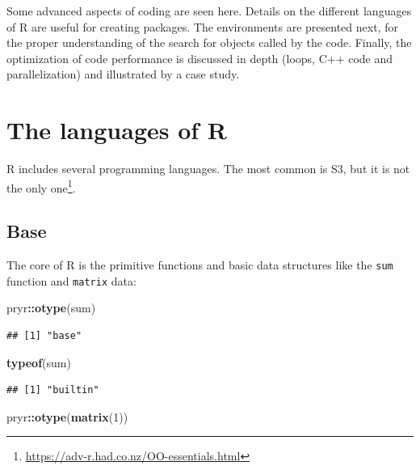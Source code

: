 \documentclass[
  12pt,
  american,
  a4paper,
  extrafontsizes,onecolumn,openright
  ]{memoir}
\newenvironment{Shaded}{\begin{snugshade}}{\end{snugshade}}
\newcommand{\DecValTok}[1]{\textcolor[rgb]{0.00,0.00,0.81}{#1}}
\newcommand{\FunctionTok}[1]{\textcolor[rgb]{0.13,0.29,0.53}{\textbf{#1}}}
\newcommand{\NormalTok}[1]{#1}
\newcommand{\SpecialCharTok}[1]{\textcolor[rgb]{0.81,0.36,0.00}{\textbf{#1}}}
\newlength{\rf}
\begin{document}
Some advanced aspects of coding are seen here.
Details on the different languages of R are useful for creating packages.
The environments are presented next, for the proper understanding of the search for objects called by the code.
Finally, the optimization of code performance is discussed in depth (loops, C++ code and parallelization) and illustrated by a case study.

\section{The languages of R}\label{the-languages-of-r}

R includes several programming languages.
The most common is S3, but it is not the only one\footnote{\url{https://adv-r.had.co.nz/OO-essentials.html}}.

\subsection{Base}\label{base}

The core of R is the primitive functions and basic data structures like the \texttt{sum} function and \texttt{matrix} data:

\scriptsize

\begin{Shaded}
\begin{Highlighting}[]
\NormalTok{pryr}\SpecialCharTok{::}\FunctionTok{otype}\NormalTok{(sum)}
\end{Highlighting}
\end{Shaded}

\begin{verbatim}
## [1] "base"
\end{verbatim}

\begin{Shaded}
\begin{Highlighting}[]
\FunctionTok{typeof}\NormalTok{(sum)}
\end{Highlighting}
\end{Shaded}

\begin{verbatim}
## [1] "builtin"
\end{verbatim}

\begin{Shaded}
\begin{Highlighting}[]
\NormalTok{pryr}\SpecialCharTok{::}\FunctionTok{otype}\NormalTok{(}\FunctionTok{matrix}\NormalTok{(}\DecValTok{1}\NormalTok{))}
\end{Highlighting}
\end{Shaded}
\end{document}
